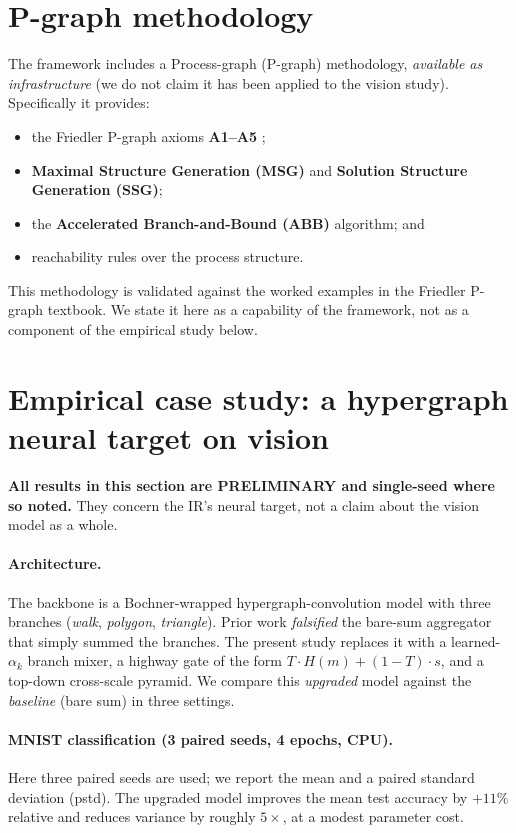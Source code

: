 \documentclass[11pt]{article}
\begin{document}
\section{P-graph methodology}
\label{sec:pgraph}
The framework includes a Process-graph (P-graph) methodology, \emph{available as
infrastructure} (we do not claim it has been applied to the vision study).
Specifically it provides:
\begin{itemize}[leftmargin=1.4em]
  \item the Friedler P-graph axioms \textbf{A1--A5} \cite{friedler1992};
  \item \textbf{Maximal Structure Generation (MSG)} and \textbf{Solution
    Structure Generation (SSG)};
  \item the \textbf{Accelerated Branch-and-Bound (ABB)} algorithm; and
  \item reachability rules over the process structure.
\end{itemize}
This methodology is validated against the worked examples in the Friedler
P-graph textbook. We state it here as a capability of the framework, not as a
component of the empirical study below.

\section{Empirical case study: a hypergraph neural target on vision}
\label{sec:empirical}
\textbf{All results in this section are PRELIMINARY and single-seed where so
noted.} They concern the IR's neural target, not a claim about the vision model
as a whole.

\paragraph{Architecture.}
The backbone is a Bochner-wrapped hypergraph-convolution model with three
branches (\emph{walk}, \emph{polygon}, \emph{triangle}). Prior work
\emph{falsified} the bare-sum aggregator that simply summed the branches. The
present study replaces it with a learned-$\alpha_k$ branch mixer, a highway gate
of the form $T \cdot H(m) + (1-T)\cdot s$, and a top-down cross-scale pyramid.
We compare this \emph{upgraded} model against the \emph{baseline} (bare sum) in
three settings.

\paragraph{MNIST classification (3 paired seeds, 4 epochs, CPU).}
Here three paired seeds are used; we report the mean and a paired standard
deviation (pstd). The upgraded model improves the mean test accuracy by
$+11\%$ relative and reduces variance by roughly $5\times$, at a modest
parameter cost.
\end{document}
